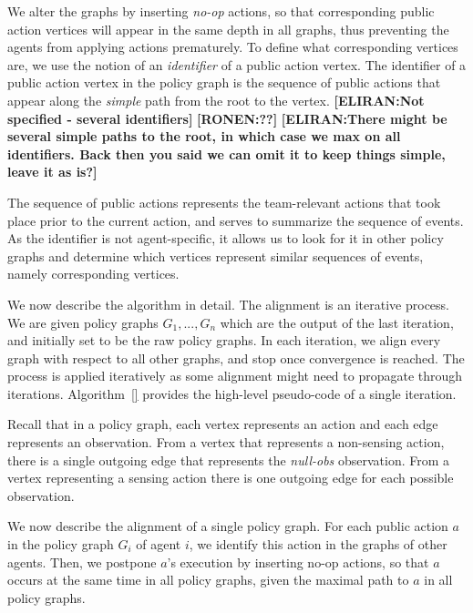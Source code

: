 \documentclass[letterpaper]{article} %
\theoremstyle{definition}
\newcommand{\eliran}[1]{\textbf{[\color{red}ELIRAN:#1]}}
\newcommand{\ronen}[1]{\textbf{[\color{blue}RONEN:#1]}}
\begin{document}
We alter the graphs by inserting \emph{no-op} actions, so that corresponding public action vertices will appear in the same depth in all graphs, thus preventing the agents from applying actions prematurely.
To define what corresponding vertices are, we use the notion of an \emph{identifier} of a public action vertex. The identifier of a public action vertex in the policy graph is the
sequence of public actions that appear along the \emph{simple} path from the root to the vertex.
\eliran{Not specified - several identifiers}
\ronen{??}
\eliran{There might be several simple paths to the root, in which case we max on all identifiers. Back then you said we can omit it to keep things simple, leave it as is?}

The sequence of public actions represents the team-relevant actions that took place prior to the current action, and serves to  summarize the sequence of events. As the identifier is not agent-specific, it allows us to look for it in other policy graphs and determine which vertices represent similar sequences of events, namely corresponding vertices.

We now describe the algorithm in detail.
The alignment is an iterative process. We are given policy graphs $G_1,...,G_n$ which are the output of the last iteration, and initially set to be the raw policy graphs. In each iteration, we align every graph with respect to all other graphs, and stop once convergence is reached. The process is applied iteratively as some alignment might need to propagate through iterations. Algorithm~\ref{} provides the high-level pseudo-code of a single iteration.

Recall that in a policy graph, each vertex represents an action and each edge represents an observation. From a vertex that represents a non-sensing action, there is a single outgoing edge that represents the \emph{null-obs} observation. From a vertex representing a sensing action there is one outgoing edge for each possible observation.

We now describe the alignment of a single policy graph. For each public action $a$ in the policy graph $G_i$ of agent $i$, we identify this action in the graphs of other agents.
Then, we postpone $a$'s execution by inserting no-op actions, so that $a$ occurs at the same time in all policy graphs, given the maximal path to $a$ in all policy graphs.
\end{document}
